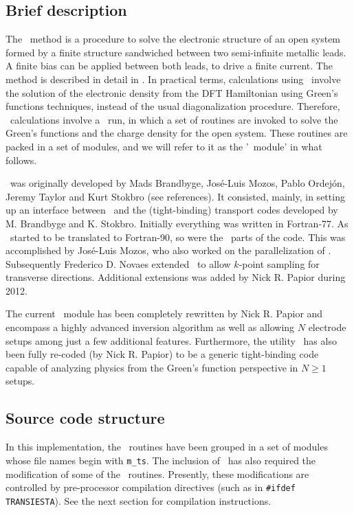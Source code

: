 \subsection{Brief description}

The \tsiesta\ method is a procedure to solve the electronic
structure of an open system formed by a finite structure sandwiched
between two semi-infinite metallic leads. A finite bias can be applied
between both leads, to drive a finite current. The method is described
in detail in \cite{Brandbyge2002}. In practical terms,
calculations using \tsiesta\ involve the solution of the
electronic density from the DFT Hamiltonian using Green's functions
techniques, instead of the usual diagonalization procedure. Therefore,
\tsiesta\ calculations involve a \siesta\ run, in which a
set of routines are invoked to solve the Green's functions and the
charge density for the open system. These routines are packed in a set
of modules, and we will refer to it as the '\tsiesta\ module'
in what follows.

\tsiesta\ was originally developed by Mads Brandbyge,
Jos\'e-Luis Mozos, Pablo Ordej\'on, Jeremy Taylor and Kurt Stokbro
(see references). It consisted, mainly, in setting up an interface
between \siesta\ and the (tight-binding) transport codes developed
by M. Brandbyge and K. Stokbro. Initially everything was written in
Fortran-77. As \siesta\ started to be translated to Fortran-90, so
were the \tsiesta\ parts of the code. This was accomplished by
Jos\'e-Luis Mozos, who also worked on the parallelization of
\tsiesta. 
%
Subsequently Frederico D. Novaes extended \tsiesta\ to allow $k$-point
sampling for transverse directions. Additional extensions was
added by Nick R. Papior during 2012.

The current \tsiesta\ module has been completely rewritten by Nick
R. Papior and encompass a highly advanced inversion algorithm as well
as allowing $N$ electrode setups among just a few additional
features. Furthermore, the utility \tbtrans\ has also been fully
re-coded (by Nick R. Papior) to be a generic tight-binding code capable
of analyzing physics from the Green's function perspective in $N\ge1$
setups.

\subsection{Source code structure}

In this implementation, the \tsiesta\ routines have been grouped in a
set of modules whose file names begin with \texttt{m\_ts}. The
inclusion of \tsiesta\ has also required the modification of some of
the \siesta\ routines. Presently, these modifications are controlled
by pre-processor compilation directives (such as in \texttt{\#ifdef
    TRANSIESTA}). See the next section for compilation instructions.

